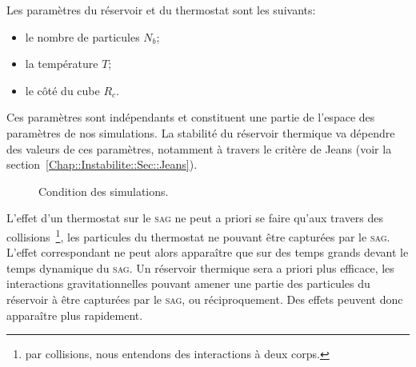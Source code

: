 	Les paramètres du réservoir et du thermostat sont les suivants:
	\begin{itemize}
		\item le nombre de particules $N_b$;
		\item la température $T$;
		\item le côté du cube $R_c$.
	\end{itemize}
	Ces paramètres sont indépendants et constituent une partie de l'espace des paramètres de nos
	simulations. La stabilité du réservoir thermique va dépendre des valeurs de ces paramètres, notamment à
	travers le critère de Jeans (voir la section~\ref{Chap::Instabilite::Sec::Jeans}).

	\begin{figure}[hbt]
		\begin{center}
			\caption{Condition des simulations.\label{Fig::CI::Repr}}
		\end{center}
	\end{figure}

	L'effet d'un thermostat sur le \textsc{sag} ne peut a priori se faire qu'aux travers des collisions~\footnote{par collisions, nous entendons
	des interactions à deux corps.}, les particules du thermostat ne pouvant être capturées par le \textsc{sag}. L'effet correspondant ne peut
	alors apparaître que sur des temps grands devant le temps dynamique du \textsc{sag}. Un réservoir thermique sera a priori plus efficace, les
	interactions gravitationnelles pouvant amener une partie des particules du réservoir à être capturées par le \textsc{sag}, ou réciproquement.
	Des effets peuvent donc apparaître plus rapidement.

